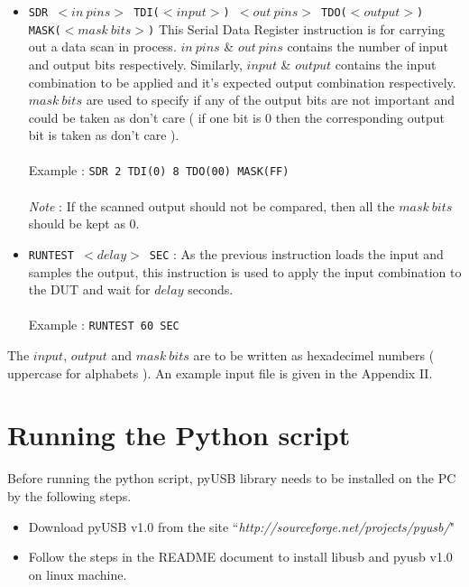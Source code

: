 \documentclass[a4paper,11pt]{article}
\begin{document}
\begin{itemize}
 \item \texttt{SDR $<in\:pins>$ TDI($<input>$) $<out\:pins>$ TDO($<output>$) MASK($<mask\:bits>$)}
	\vspace*{0.3cm}
	\newline This Serial Data Register instruction is for carrying out a data scan in process. $in\:pins$ \& $out\:pins$ contains the number of input and output bits respectively. Similarly, $input$ \& $output$ contains the input combination to be applied and it's expected output combination respectively. $mask\:bits$ are used to specify if any of the output bits are not important and could be taken as don't care ( if one bit is 0 then the corresponding output bit is taken as don't care ).\\\\
Example : \texttt{SDR 2 TDI(0) 8 TDO(00) MASK(FF)}
\\\\
\textit{Note} : If the scanned output should not be compared, then all the $mask\:bits$ should be kept as 0.
 \item \texttt{RUNTEST $<delay>$ SEC} :
	\vspace*{0.3cm}
	\newline As the previous instruction loads the input and samples the output, this instruction is used to apply the input combination to the DUT and wait for $delay$ seconds.\\\\
Example : \texttt{RUNTEST 60 SEC}
\end{itemize}

The $input$, $output$ and $mask\:bits$ are to be written as hexadecimel numbers ( uppercase for alphabets ). An example input file is given in the Appendix II.

\section{Running the Python script}
Before running the python script, pyUSB library needs to be installed on the PC by the following steps.

\begin{itemize}
\item Download pyUSB v1.0 from the site ``\textit{http://sourceforge.net/projects/pyusb/}"
\item Follow the steps in the README document to install libusb and pyusb v1.0 on linux machine.
\end{itemize}
\end{document}
